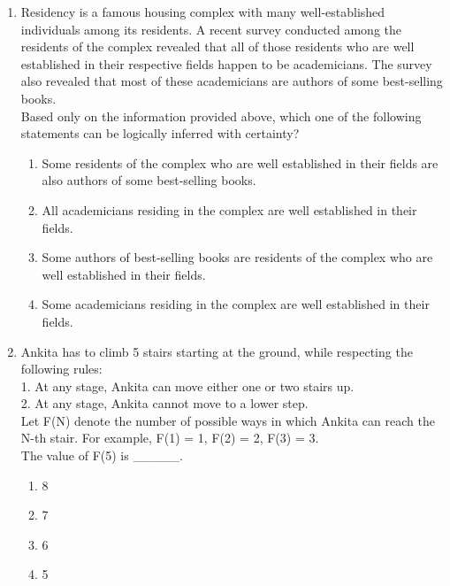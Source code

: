 \documentclass[journal,12pt,onecolumn]{IEEEtran}
\begin{document}
\begin{enumerate}
    \item Residency is a famous housing complex with many well-established individuals among its residents. A recent survey conducted among the residents of the complex revealed that all of those residents who are well established in their respective fields happen to be academicians. The survey also revealed that most of these academicians are authors of some best-selling books.\\
    Based only on the information provided above, which one of the following statements can be logically inferred with certainty?
    \begin{enumerate}
        \item Some residents of the complex who are well established in their fields are also authors of some best-selling books.
        \item All academicians residing in the complex are well established in their fields.
        \item Some authors of best-selling books are residents of the complex who are well established in their fields.
        \item Some academicians residing in the complex are well established in their fields.
    \end{enumerate}

    \item Ankita has to climb 5 stairs starting at the ground, while respecting the following rules:\\
    1. At any stage, Ankita can move either one or two stairs up.\\
    2. At any stage, Ankita cannot move to a lower step.\\
    Let F(N) denote the number of possible ways in which Ankita can reach the N-th stair. For example, F(1) = 1, F(2) = 2, F(3) = 3.\\
    The value of F(5) is \_\_\_\_\_.
    \begin{enumerate}
        \item 8
        \item 7
        \item 6
        \item 5
    \end{enumerate}


\end{enumerate}
\end{document}
